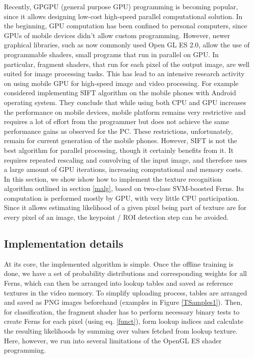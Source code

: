 \documentclass[10pt,twocolumn, a4paper]{article}
\begin{document}
Recently, GPGPU (general purpose GPU) programming is becoming popular, since it allows designing low-cost high-speed parallel computational solution. In the beginning, GPU computation has been confined to personal computers, since GPUs of mobile devices didn't allow custom programming. However, newer graphical libraries, such as now commonly used Open GL ES 2.0, allow the use of programmable shaders, small programs that run in parallel on GPU. In particular, fragment shaders, that run for each pixel of the output image, are well suited for image processing tasks. This has lead to an intensive research activity on using mobile GPU for high-speed image and video processing. For example \cite{gpusift1} considered implementing SIFT algorithm on the mobile phones with Android operating system. They conclude that while using both CPU and GPU increases the performance on mobile devices, mobile platform remains very restrictive and requires a lot of effort from the programmer but does not achieve the same performance gains as observed for the PC. These restrictions, unfortunately, remain for current generation of the mobile phones.
However, SIFT is not the best algorithm for parallel processing, though it certainly benefits from it. It requires repeated rescaling and convolving of the input image, and therefore uses a large amount of GPU iterations, increasing computational and memory costs. 
 In this section, we show ishow how to implement the texture recognition algorithm outlined in section \ref{malg}, based on two-class SVM-boosted Ferns. Its computation is performed mostly by GPU, with very little CPU participation. Since it allows estimating likelihood of a given pixel being part of texture are for every pixel of an image, the keypoint / ROI detection step can be avoided.
\subsection{Implementation details}
At its core, the implemented algorithm is simple. Once the offline training is done, we have a set of probability distributions and corresponding weights for all Ferns, which can then be arranged into lookup tables and saved as reference textures in the video memory. To simplify uploading process, tables are arranged and saved as PNG images beforehand (examples in Figure \ref{TSamples1}). Then, for classification, the fragment shader has to perform necessary binary tests to create Ferns for each pixel (using eq.  \ref{funct}), form lookup indices and calculate the resulting likelihoods by summing over values fetched from lookup texture. Here, however, we run into several limitations of the OpenGL ES shader programming.
\end{document}
